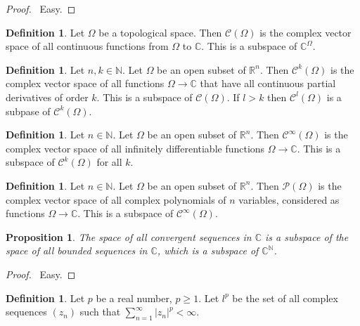 \documentclass{book}
\let\qed\relax
\newtheorem{prop}[ax]{Proposition}
\theoremstyle{definition}
\newtheorem{df}[ax]{Definition}
\begin{document}
\begin{proof}
\pf\ Easy. \qed
\end{proof}

\begin{df}
Let $\Omega$ be a topological space. Then $\mathcal{C}(\Omega)$ is the complex vector space of all continuous functions from $\Omega$ to $\mathbb{C}$. This is a subspace of $\mathbb{C}^\Omega$.
\end{df}

\begin{df}
Let $n, k \in \mathbb{N}$.
Let $\Omega$ be an open subset of $\mathbb{R}^n$. Then $\mathcal{C}^k(\Omega)$ is the complex vector space of all functions $\Omega \rightarrow \mathbb{C}$ that have all continuous partial derivatives of order $k$. This is a subspace of $\mathcal{C}(\Omega)$. If $l > k$ then $\mathcal{C}^l(\Omega)$ is a subpase of $\mathcal{C}^k(\Omega)$.
\end{df}

\begin{df}
Let $n \in \mathbb{N}$. Let $\Omega$ be an open subset of $\mathbb{R}^n$. Then $\mathcal{C}^\infty(\Omega)$ is the complex vector space of all infinitely differentiable functions $\Omega \rightarrow \mathbb{C}$. This is a subspace of $\mathcal{C}^k(\Omega)$ for all $k$.
\end{df}

\begin{df}
Let $n \in \mathbb{N}$. Let $\Omega$ be an open subset of $\mathbb{R}^n$. Then $\mathcal{P}(\Omega)$ is the complex vector space of all complex polynomials of $n$ variables, considered as functions $\Omega \rightarrow \mathbb{C}$. This is a subspace of $\mathcal{C}^\infty(\Omega)$.
\end{df}

\begin{prop}
The space of all convergent sequences in $\mathbb{C}$ is a subspace of the space of all bounded sequences in $\mathbb{C}$, which is a subspace of $\mathbb{C}^\mathbb{N}$.
\end{prop}

\begin{proof}
\pf\ Easy. \qed
\end{proof}

\begin{df}
Let $p$ be a real number, $p \geq 1$. Let $l^p$ be the set of all complex sequences $(z_n)$ such that $\sum_{n=1}^\infty |z_n|^p < \infty$.
\end{df}
\end{document}
